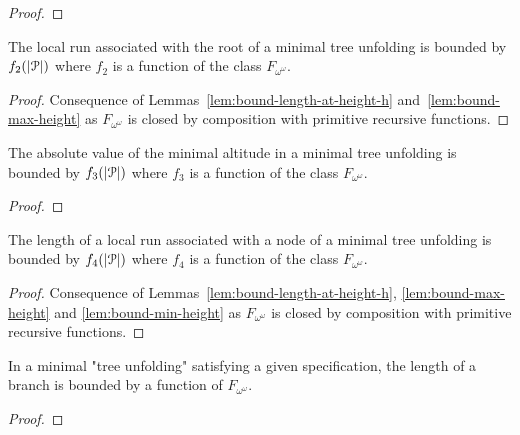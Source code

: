 \ifproofs
\begin{proof}
\end{proof}
\fi

\begin{corollary}
	The local run associated with the root of a minimal tree unfolding is bounded by $f_2(|\mathcal{P}|)$ where $f_2$ is a function of the class $F_{\omega^\omega}$.
\end{corollary}

\ifproofs
\begin{proof}
	Consequence of Lemmas~\ref{lem:bound-length-at-height-h} and~\ref{lem:bound-max-height} as $F_{\omega^\omega}$ is closed by composition with primitive recursive functions.
\end{proof}
\fi

\begin{lemma}
	\label{lem:bound-min-height}
	The absolute value of the minimal altitude in a minimal tree unfolding is bounded by $f_3(|\mathcal{P}|)$ where $f_3$ is a function of the class $F_{\omega^\omega}$.
\end{lemma}

\ifproofs
\begin{proof}
\end{proof}
\fi


\begin{corollary}
	\label{lem:bound-node-size}
	The length of a local run associated with a node of a minimal tree unfolding is bounded by $f_4(|\mathcal{P}|)$ where $f_4$ is a function of the class $F_{\omega^\omega}$.
\end{corollary}

\ifproofs
\begin{proof}
	Consequence of Lemmas~\ref{lem:bound-length-at-height-h}, \ref{lem:bound-max-height} and \ref{lem:bound-min-height} as $F_{\omega^\omega}$ is closed by composition with primitive recursive functions.
\end{proof}
\fi


\begin{proposition}
	In a minimal "tree unfolding" satisfying a given specification, the length of a branch is bounded by a function of $F_{\omega^\omega}$.
\end{proposition}

\ifproofs
\begin{proof}
\end{proof}
\fi
%





